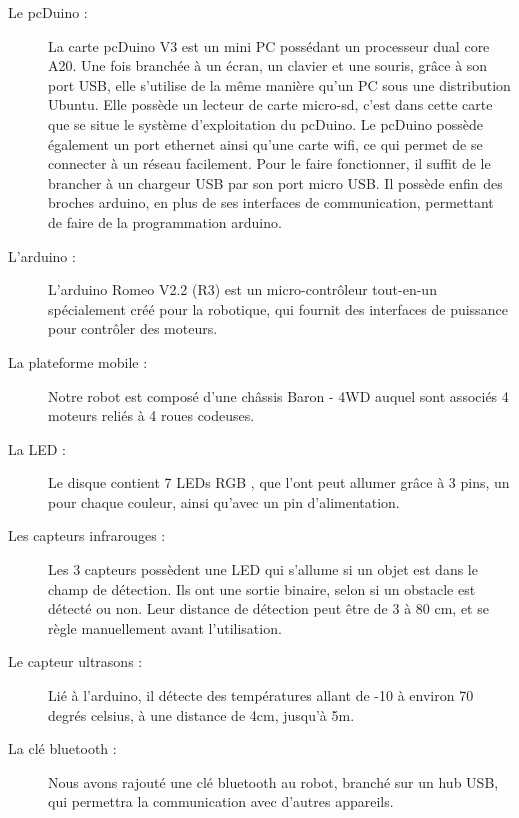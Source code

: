 \documentclass[12pt,francais]{report}
\begin{document}
\begin{description}
\item [Le pcDuino :] La carte pcDuino V3 est un mini PC possédant un processeur dual core A20. Une fois branchée à un écran, un clavier et une souris, grâce à son port USB, elle s'utilise de la même manière qu'un PC sous une distribution Ubuntu. Elle possède un lecteur de carte micro-sd,  c'est dans cette carte que se situe le système d'exploitation du pcDuino. Le pcDuino possède également un port ethernet ainsi qu'une carte wifi, ce qui permet de se connecter à un réseau facilement. Pour le faire fonctionner, il suffit de le brancher à un chargeur USB par son port micro USB. Il possède enfin des broches arduino, en plus de ses interfaces de communication, permettant de faire de la programmation arduino.\cite{ref3}
\item [L'arduino :] L'arduino Romeo V2.2 (R3) \cite{ref4} est un micro-contrôleur tout-en-un spécialement créé pour la robotique, qui fournit des interfaces de puissance pour contrôler des moteurs.
\item [La plateforme mobile :] Notre robot est composé d'une châssis Baron - 4WD auquel sont associés 4 moteurs reliés à 4 roues codeuses. \cite{ref5}
\item [La LED :] Le disque contient 7 LEDs RGB \cite{ref6}, que l'ont peut allumer grâce à 3 pins, un pour chaque couleur, ainsi qu'avec un pin d'alimentation.
\item [Les capteurs infrarouges :] Les 3 capteurs possèdent une LED qui s'allume si un objet est dans le champ de détection. Ils ont une sortie binaire, selon si un obstacle est détecté ou non. Leur distance de détection peut être de 3 à 80 cm, et se règle manuellement avant l'utilisation. \cite{ref7}
\item [Le capteur ultrasons :] Lié à l'arduino, il détecte des températures allant de -10 à environ 70 degrés celsius, à une distance de 4cm, jusqu'à 5m. \cite{ref8}
\item [La clé bluetooth :] Nous avons rajouté une clé bluetooth au robot, branché sur un hub USB, qui permettra la communication avec d'autres appareils.
\end{description}
\end{document}
